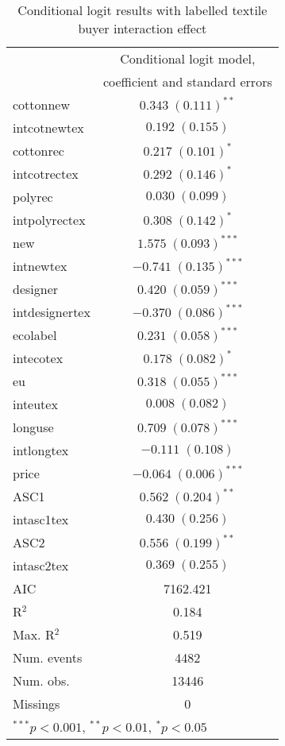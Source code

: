 \begin{table}[ht]
\begin{center}
\begin{tabular}{l c }
\hline
 & Conditional logit model,\\ & coefficient and standard errors \\
\hline
cottonnew      & $0.343 \; (0.111)^{**}$   \\
intcotnewtex   & $0.192 \; (0.155)$        \\
cottonrec      & $0.217 \; (0.101)^{*}$    \\
intcotrectex   & $0.292 \; (0.146)^{*}$    \\
polyrec        & $0.030 \; (0.099)$        \\
intpolyrectex  & $0.308 \; (0.142)^{*}$    \\
new            & $1.575 \; (0.093)^{***}$  \\
intnewtex      & $-0.741 \; (0.135)^{***}$ \\
designer       & $0.420 \; (0.059)^{***}$  \\
intdesignertex & $-0.370 \; (0.086)^{***}$ \\
ecolabel       & $0.231 \; (0.058)^{***}$  \\
intecotex      & $0.178 \; (0.082)^{*}$    \\
eu             & $0.318 \; (0.055)^{***}$  \\
inteutex       & $0.008 \; (0.082)$        \\
longuse        & $0.709 \; (0.078)^{***}$  \\
intlongtex     & $-0.111 \; (0.108)$       \\
price          & $-0.064 \; (0.006)^{***}$ \\
ASC1           & $0.562 \; (0.204)^{**}$   \\
intasc1tex     & $0.430 \; (0.256)$        \\
ASC2           & $0.556 \; (0.199)^{**}$   \\
intasc2tex     & $0.369 \; (0.255)$        \\
\hline
AIC            & 7162.421                  \\
R$^2$          & 0.184                     \\
Max. R$^2$     & 0.519                     \\
Num. events    & 4482                      \\
Num. obs.      & 13446                     \\
Missings       & 0                         \\
\hline
\multicolumn{2}{l}{\scriptsize{$^{***}p<0.001$, $^{**}p<0.01$, $^*p<0.05$}}
\end{tabular}
\caption{Conditional logit results with labelled textile buyer interaction effect}
\label{tab:ConditionalLogitModelBlt}
\end{center}
\end{table}
